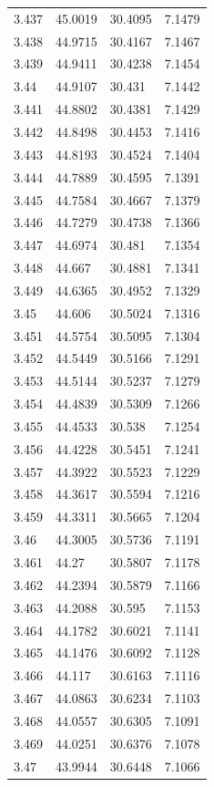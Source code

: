 \begin{tabular}{llll}
3.437 & 45.0019 & 30.4095 & 7.1479 \\
3.438 & 44.9715 & 30.4167 & 7.1467 \\
3.439 & 44.9411 & 30.4238 & 7.1454 \\
3.44 & 44.9107 & 30.431 & 7.1442 \\
3.441 & 44.8802 & 30.4381 & 7.1429 \\
3.442 & 44.8498 & 30.4453 & 7.1416 \\
3.443 & 44.8193 & 30.4524 & 7.1404 \\
3.444 & 44.7889 & 30.4595 & 7.1391 \\
3.445 & 44.7584 & 30.4667 & 7.1379 \\
3.446 & 44.7279 & 30.4738 & 7.1366 \\
3.447 & 44.6974 & 30.481 & 7.1354 \\
3.448 & 44.667 & 30.4881 & 7.1341 \\
3.449 & 44.6365 & 30.4952 & 7.1329 \\
3.45 & 44.606 & 30.5024 & 7.1316 \\
3.451 & 44.5754 & 30.5095 & 7.1304 \\
3.452 & 44.5449 & 30.5166 & 7.1291 \\
3.453 & 44.5144 & 30.5237 & 7.1279 \\
3.454 & 44.4839 & 30.5309 & 7.1266 \\
3.455 & 44.4533 & 30.538 & 7.1254 \\
3.456 & 44.4228 & 30.5451 & 7.1241 \\
3.457 & 44.3922 & 30.5523 & 7.1229 \\
3.458 & 44.3617 & 30.5594 & 7.1216 \\
3.459 & 44.3311 & 30.5665 & 7.1204 \\
3.46 & 44.3005 & 30.5736 & 7.1191 \\
3.461 & 44.27 & 30.5807 & 7.1178 \\
3.462 & 44.2394 & 30.5879 & 7.1166 \\
3.463 & 44.2088 & 30.595 & 7.1153 \\
3.464 & 44.1782 & 30.6021 & 7.1141 \\
3.465 & 44.1476 & 30.6092 & 7.1128 \\
3.466 & 44.117 & 30.6163 & 7.1116 \\
3.467 & 44.0863 & 30.6234 & 7.1103 \\
3.468 & 44.0557 & 30.6305 & 7.1091 \\
3.469 & 44.0251 & 30.6376 & 7.1078 \\
3.47 & 43.9944 & 30.6448 & 7.1066 \\

\end{tabular}
